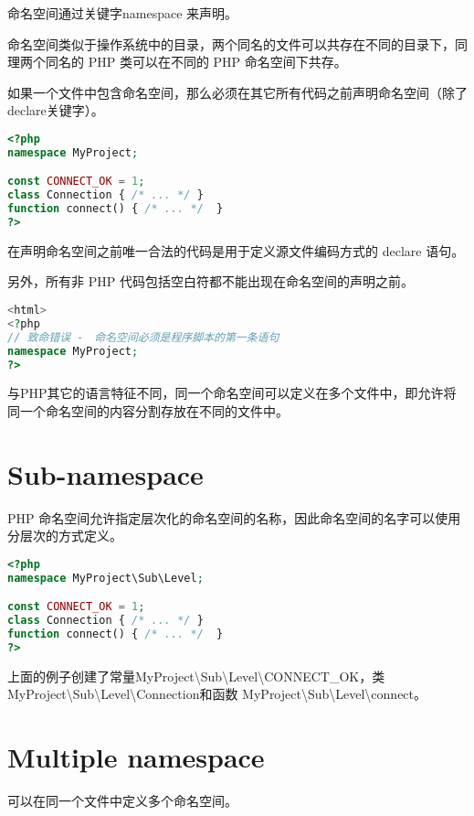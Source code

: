 命名空间通过关键字namespace 来声明。

命名空间类似于操作系统中的目录，两个同名的文件可以共存在不同的目录下，同理两个同名的 PHP 类可以在不同的 PHP 命名空间下共存。

如果一个文件中包含命名空间，那么必须在其它所有代码之前声明命名空间（除了declare关键字）。


\begin{lstlisting}[language=PHP]
<?php
namespace MyProject;

const CONNECT_OK = 1;
class Connection { /* ... */ }
function connect() { /* ... */  }
?>
\end{lstlisting}


在声明命名空间之前唯一合法的代码是用于定义源文件编码方式的 declare 语句。

另外，所有非 PHP 代码包括空白符都不能出现在命名空间的声明之前。

\begin{lstlisting}[language=PHP]
<html>
<?php
// 致命错误 -　命名空间必须是程序脚本的第一条语句
namespace MyProject;
?>
\end{lstlisting}


与PHP其它的语言特征不同，同一个命名空间可以定义在多个文件中，即允许将同一个命名空间的内容分割存放在不同的文件中。


\section{Sub-namespace}


PHP 命名空间允许指定层次化的命名空间的名称，因此命名空间的名字可以使用分层次的方式定义。


\begin{lstlisting}[language=PHP]
<?php
namespace MyProject\Sub\Level;

const CONNECT_OK = 1;
class Connection { /* ... */ }
function connect() { /* ... */  }
?>
\end{lstlisting}



上面的例子创建了常量MyProject\textbackslash Sub\textbackslash Level\textbackslash CONNECT\_OK，类 MyProject\textbackslash Sub\textbackslash Level\textbackslash Connection和函数 MyProject\textbackslash Sub\textbackslash Level\textbackslash connect。

\section{Multiple namespace}

可以在同一个文件中定义多个命名空间。

